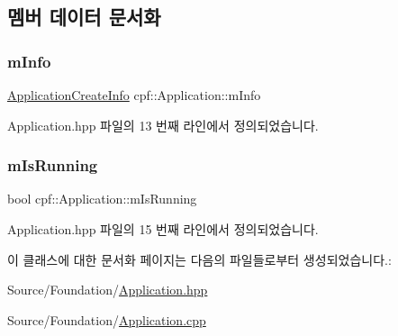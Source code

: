 \subsection{멤버 데이터 문서화}
\mbox{\label{classcpf_1_1_application_aeef620fe71f2ac891e3650d6d3462b28}} 
\subsubsection{\texorpdfstring{m\+Info}{mInfo}}
{\footnotesize\ttfamily \hyperlink{structcpf_1_1_application_create_info}{Application\+Create\+Info} cpf\+::\+Application\+::m\+Info\hspace{0.3cm}{\ttfamily [protected]}}



Application.\+hpp 파일의 13 번째 라인에서 정의되었습니다.

\mbox{\label{classcpf_1_1_application_a84a6e2bafcc39719acee9885a064ac75}} 
\subsubsection{\texorpdfstring{m\+Is\+Running}{mIsRunning}}
{\footnotesize\ttfamily bool cpf\+::\+Application\+::m\+Is\+Running\hspace{0.3cm}{\ttfamily [protected]}}



Application.\+hpp 파일의 15 번째 라인에서 정의되었습니다.



이 클래스에 대한 문서화 페이지는 다음의 파일들로부터 생성되었습니다.\+:\begin{DoxyCompactItemize}
\item 
Source/\+Foundation/\hyperlink{_application_8hpp}{Application.\+hpp}\item 
Source/\+Foundation/\hyperlink{_application_8cpp}{Application.\+cpp}\end{DoxyCompactItemize}
